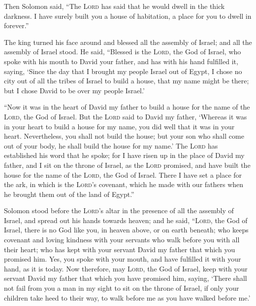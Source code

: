  Then Solomon said, ``The \textsc{Lord} has said that he
would dwell in the thick darkness.  I have surely built
you a house of habitation, a place for you to dwell in forever.''

 The king turned his face around and blessed all the
assembly of Israel; and all the assembly of Israel stood.
 He said, ``Blessed is the \textsc{Lord}, the God of
Israel, who spoke with his mouth to David your father, and has with his
hand fulfilled it, saying,  `Since the day that I brought
my people Israel out of Egypt, I chose no city out of all the tribes of
Israel to build a house, that my name might be there; but I chose David
to be over my people Israel.'

 ``Now it was in the heart of David my father to build a
house for the name of the \textsc{Lord}, the God of Israel.
 But the \textsc{Lord} said to David my father, `Whereas
it was in your heart to build a house for my name, you did well that it
was in your heart.  Nevertheless, you shall not build the
house; but your son who shall come out of your body, he shall build the
house for my name.'  The \textsc{Lord} has established
his word that he spoke; for I have risen up in the place of David my
father, and I sit on the throne of Israel, as the \textsc{Lord}
promised, and have built the house for the name of the \textsc{Lord},
the God of Israel.  There I have set a place for the ark,
in which is the \textsc{Lord}'s covenant, which he made with our fathers
when he brought them out of the land of Egypt.''

 Solomon stood before the \textsc{Lord}'s altar in the
presence of all the assembly of Israel, and spread out his hands towards
heaven;  and he said, ``\textsc{Lord}, the God of Israel,
there is no God like you, in heaven above, or on earth beneath; who
keeps covenant and loving kindness with your servants who walk before
you with all their heart;  who has kept with your servant
David my father that which you promised him. Yes, you spoke with your
mouth, and have fulfilled it with your hand, as it is today.
 Now therefore, may \textsc{Lord}, the God of Israel,
keep with your servant David my father that which you have promised him,
saying, `There shall not fail from you a man in my sight to sit on the
throne of Israel, if only your children take heed to their way, to walk
before me as you have walked before me.'

